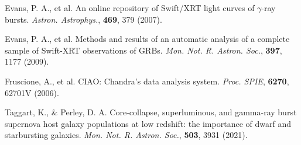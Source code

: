\documentclass{nature_plusfigure}
\newcommand{\mn}{{Mon. Not. R. Astron. Soc.}}
\newcommand{\mnras}{\mn}
\newcommand{\apj}{{Astrophys. J.}}
\newcommand{\aap}{{Astron. Astrophys.}}
\newcommand{\procspie}{Proc. SPIE}
\begin{document}
\begin{methods}
\begin{thebibliography}{10}
 Evans, P. A., et al. An online repository of Swift/XRT light curves of $\gamma$-ray bursts. \emph{\aap}, \textbf{469}, 379 (2007). 

 Evans, P. A., et al. Methods and results of an automatic analysis of a complete sample of Swift-XRT observations of GRBs. \emph{\mnras}, \textbf{397}, 1177 (2009). 

 Fruscione, A., et al. CIAO: Chandra's data analysis system. \emph{\procspie}, \textbf{6270}, 62701V (2006). 


 Taggart, K., \& Perley, D. A. Core-collapse, superluminous, and gamma-ray burst supernova host galaxy populations at low redshift: the importance of dwarf and starbursting galaxies. \emph{\mnras}, \textbf{503}, 3931 (2021). 


%
%
%

\end{thebibliography}

\end{methods}

\clearpage
\end{document}
